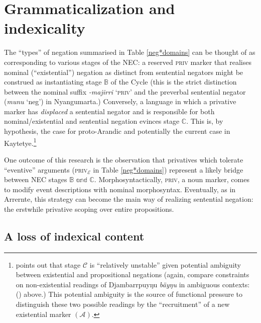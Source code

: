 \section{Grammaticalization and indexicality}

The ``types'' of negation summarised in Table \ref{neg*domains} can be thought of as corresponding to various stages of the \acrshort{NEC}: a reserved \textsc{priv} marker that realises nominal (``existential'') negation as distinct from sentential negators might be construed as instantiating stage $ \mathbb B  $ of the Cycle (this is the strict distinction between the nominal suffix \textit{-majirri} `\textsc{priv}' and the preverbal sentential negator (\textit{munu} `\gls{neg}') in Nyangumarta.) Conversely, a language in which a privative marker has \textit{displaced} a sentential negator and is responsible for both nominal/existential and sentential negation evinces stage $ \mathbb C $. This is, by hypothesis, the case for proto-Arandic and potentially the current case in Kaytetye.\footnote{\citet[19]{Croft1991} points out that stage $ \mathcal{C} $ is ``relatively unstable'' given potential ambiguity between existential and propositional negations (again, compare constraints on non-existential readings of Djambarrpuyŋu \textit{bäyŋu} in ambiguous contexts: () above.) This potential ambiguity is the source of functional pressure to distinguish these two possible readings by the ``recruitment'' of a new existential marker $ (\mathcal A) $.}
	
One outcome of this research is the observation that privatives which tolerate ``eventive'' arguments (\textsc{priv$ _{\mathcal E} $} in Table \ref{neg*domains}) represent a likely bridge between \acrshort{NEC} stages $ \mathbb{B\text{ and }C} $. Morphosyntactically, \textsc{priv}, a noun marker, comes to modify event descriptions with nominal morphosyntax. Eventually, as in Arrernte, this strategy can become the main way of realizing sentential negation: the erstwhile privative scoping over entire propositions.

\subsection{A loss of indexical content}


